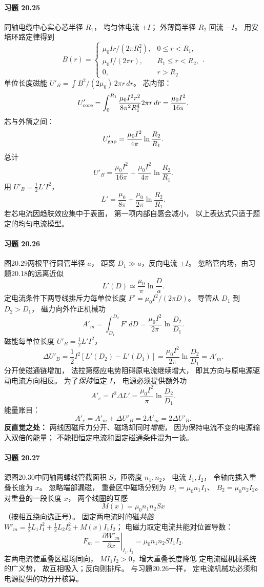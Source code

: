 \paragraph{习题 20.25}
同轴电缆中心实心芯半径 \(R_1\)，
均匀体电流 \(+I\)；
外薄筒半径 \(R_2\) 回流 \(-I\)。
用安培环路定律得到
\[
 \boxed{B(r)=
 \begin{cases}
 \mu_0Ir/(2\pi R_1^2),&0\le r<R_1,\\
 \mu_0I/(2\pi r),&R_1\le r<R_2,\\
 0,&r>R_2
 \end{cases}}.
\]
单位长度磁能
\(U'_B=\int B^2/(2\mu_0)\,2\pi r\,dr\)。
芯内部：
\[
 U'_{\rm core}=\int_0^{R_1}
 \frac{\mu_0I^2r^2}{8\pi^2R_1^4}2\pi r\,dr
 =\frac{\mu_0I^2}{16\pi}.
\]
芯与外筒之间：
\[
 U'_{\rm gap}=\frac{\mu_0I^2}{4\pi}
 \ln\frac{R_2}{R_1}.
\]
总计
\[
 \boxed{U'_B=\frac{\mu_0I^2}{16\pi}
 +\frac{\mu_0I^2}{4\pi}\ln\frac{R_2}{R_1}}.
\]
用 \(U'_B=\tfrac12L'I^2\)，
\[
 \boxed{L'=\frac{\mu_0}{8\pi}
 +\frac{\mu_0}{2\pi}\ln\frac{R_2}{R_1}}.
\]
若芯电流因趋肤效应集中于表面，
第一项内部自感会减小，
以上表达式只适于题定的均匀电流模型。

\paragraph{习题 20.26}
图20.29两根平行圆管半径 \(a\)，
距离 \(D_1\gg a\)，反向电流 \(\pm I\)。
忽略管内场，由习题20.18的远离近似
\[
 \boxed{L'(D)\simeq\frac{\mu_0}{\pi}\ln\frac Da}.
\]
定电流条件下两导线排斥力每单位长度
\(F'=\mu_0I^2/(2\pi D)\)。
导管从 \(D_1\) 到 \(D_2>D_1\)，
磁力向外作正机械功
\[
 \boxed{A'_m=
 \int_{D_1}^{D_2}F'\,dD
 =\frac{\mu_0I^2}{2\pi}\ln\frac{D_2}{D_1}}.
\]
磁能每单位长度
\(U'_B=\tfrac12L'I^2\)，
\[
 \boxed{\Delta U'_B=
 \frac12I^2[L'(D_2)-L'(D_1)]
 =\frac{\mu_0I^2}{2\pi}\ln\frac{D_2}{D_1}
 =A'_m}.
\]
分开使磁通链增加，
法拉第感应电势阻碍原电流继续增大，
即其方向与原电源驱动电流方向相反。
为了\emph{保持}恒定 \(I\)，
电源必须提供额外功
\[
 \boxed{A'_e=I^2\Delta L'
 =\frac{\mu_0I^2}{\pi}\ln\frac{D_2}{D_1}}.
\]
能量账目：
\[
 \boxed{A'_e=A'_m+\Delta U'_B
 =2A'_m=2\Delta U'_B}.
\]
\textbf{反直觉之处：}
两线因磁斥力分开、磁场却同时\emph{增能}，
因为保持电流不变的电源输入双倍的能量；
不能把恒定电流和固定磁通条件混为一谈。

\paragraph{习题 20.27}
源图20.30中同轴两螺线管截面积
\(S\)，匝密度 \(n_1,n_2\)，
电流 \(I_1,I_2\)，
令轴向插入重叠长度为 \(x\)。
忽略端部漏磁，
重叠区中磁场分别为
\(B_1=\mu_0n_1I_1\)、
\(B_2=\mu_0n_2I_2\)。
对重叠的一段长度 \(x\)，
两个线圈的互感
\[
 M(x)=\mu_0n_1n_2Sx
\]
（按相互绕向选正号）。
固定两电流时的磁\emph{共能}
\(W'_m=\frac12L_1I_1^2+\frac12L_2I_2^2
 +M(x)I_1I_2\)；
电磁力取定电流共能对位置导数：
\[
 \boxed{F_m=\left.
 \frac{\partial W'_m}{\partial x}
 \right|_{I_1,I_2}
 =\mu_0n_1n_2SI_1I_2}.
\]
若两电流使重叠区磁场同向，
\(M I_1I_2>0\)，增大重叠长度降低
定电流磁机械系统的广义势，
故互相吸入；反向则排斥。
与习题20.26一样，
定电流机械功必须和电源提供的功分开核算。
